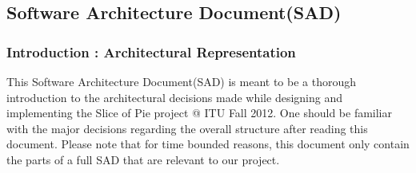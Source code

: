 \subsection{Software Architecture Document(SAD)}
\subsubsection{Introduction : Architectural Representation}
This Software Architecture Document(SAD) is meant to be a thorough introduction to the architectural decisions made while designing and implementing the Slice of Pie project @ ITU Fall 2012.
One should be familiar with the major decisions regarding the overall structure after reading this document. Please note that for time bounded reasons, this document only contain the parts of a full SAD that are relevant to our project. 
